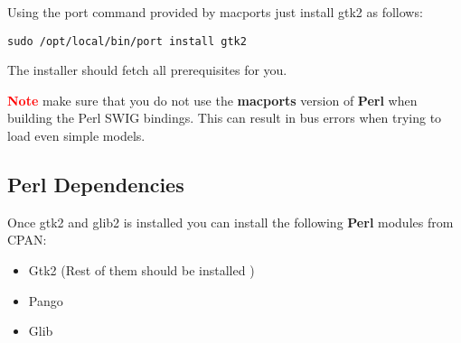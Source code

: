 \documentclass[12pt]{article}
\begin{document}
Using the port command provided by macports just install gtk2 as follows:

\begin{verbatim}
sudo /opt/local/bin/port install gtk2
\end{verbatim}

The installer should fetch all prerequisites for you.

\textcolor{red}{\bf Note} make sure that you do not use the {\bf macports} version of {\bf Perl} when building the Perl SWIG bindings. This can result in bus errors when trying to load even simple models.



\subsection*{Perl Dependencies}

Once gtk2 and glib2 is installed you can install the following {\bf Perl} modules from CPAN:

\begin{itemize}
\item[] Gtk2 (Rest of them should be installed )
\item[] Pango
\item[] Glib
\end{itemize}
\end{document}
